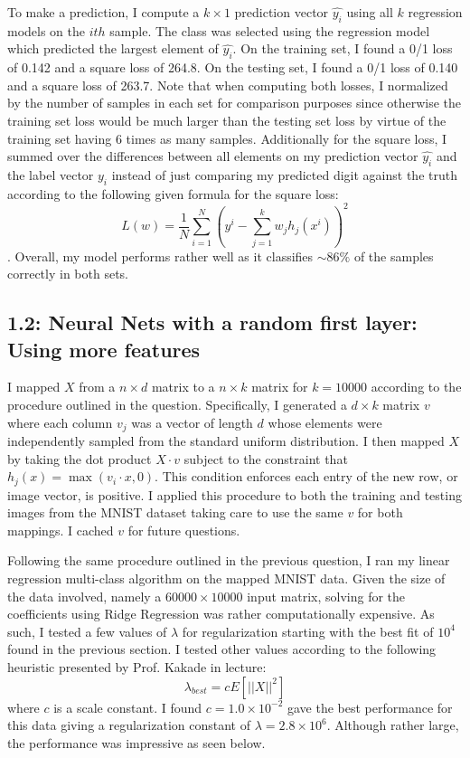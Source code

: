 \documentclass[12pt]{amsart}
\begin{document}
To make a prediction, I compute a $k \times 1$ prediction vector $\hat{y_i}$ using all $k$ regression models on the $ith$ sample.  The class was selected using the regression model which predicted the largest element of $\hat{y_i}$.  On the training set, I found a 0/1 loss of 0.142 and a square loss of 264.8.  On the testing set, I found a 0/1 loss of 0.140 and a square loss of 263.7.  Note that when computing both losses, I normalized by the number of samples in each set for comparison purposes since otherwise the training set loss would be much larger than the testing set loss by virtue of the training set having 6 times as many samples.  Additionally for the square loss, I summed over the differences between all elements on my prediction vector $\hat{y_i}$ and the label vector $y_i$ instead of just comparing my predicted digit against the truth according to the following given formula for the square loss:
\begin{equation} \label{eqn:square_loss}
L(w) = \frac{1}{N} \sum_{i = 1}^N \left(y^i - \sum_{j = 1}^k w_j h_j(x^i)  \right)^2
\end{equation}.  
Overall, my model performs rather well as it classifies ${\sim}86\%$ of the samples correctly in both sets.

\subsection*{1.2: Neural Nets with a random first layer: Using more features}

I mapped $X$ from a $n \times d$ matrix to a $n \times k$ matrix for $k=10000$ according to the procedure outlined in the question.  Specifically, I generated a $d \times k$ matrix $v$ where each column $v_j$ was a vector of length $d$ whose elements were independently sampled from the standard uniform distribution.  I then mapped $X$ by taking the dot product $X \cdot v$ subject to the constraint that $h_j(x) = \max{(v_i \cdot x,0)}$.  This condition enforces each entry of the new row, or image vector, is positive.  I applied this procedure to both the training and testing images from the MNIST dataset taking care to use the same $v$ for both mappings.  I cached $v$ for future questions.

Following the same procedure outlined in the previous question, I ran my linear regression multi-class algorithm on the mapped MNIST data.  Given the size of the data involved, namely a $60000 \times 10000$ input matrix, solving for the coefficients using Ridge Regression was rather computationally expensive.  As such, I tested a few values of $\lambda$ for regularization starting with the best fit of $10^4$ found in the previous section.  I tested other values according to the following heuristic presented by Prof. Kakade in lecture:
\begin{equation} \label{eqn:lambda_heuristic}
\lambda_{best} = c E[||X||^2]
\end{equation}
where $c$ is a scale constant.  I found $c = 1.0 \times 10^{-2}$ gave the best performance for this data giving a regularization constant of $\lambda = 2.8 \times 10^6$.  Although rather large, the performance was impressive as seen below.
 
\end{document}
